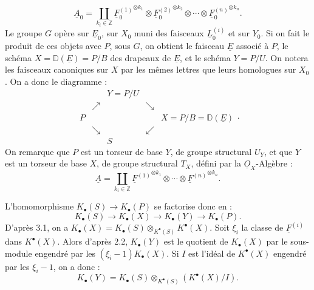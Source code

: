 
\[
\underline{A}_0=\coprod_{k_i\in\mathbb Z}{\underline{F}_0^{(1)}}^{\otimes k_1}\otimes {\underline{F}_0^{(2)}}^{\otimes k_2}\otimes\cdots\otimes{\underline{F}_0^{(n)}}^{\otimes k_n}.
\]
Le
groupe $G$ opère sur $\underline{E}_0$, sur $X_0$ muni des faisceaux $\underline{L}_0^{(i)}$ et sur $Y_0$. Si on fait le produit de ces objets avec $P$, sous $G$, on obtient le faisceau $\underline{E}$ associé à $P$, le schéma $X=\mathbb D(\underline{E})=P/B$ des drapeaux de $\underline{E}$, et le schéma $Y=P/U$. On notera les faisceaux canoniques sur $X$ par les mêmes lettres que leurs homologues sur $X_0$. On a donc le diagramme :
\[
\begin{array}{ccccc}
&& Y=P/U &&\\[-0.2em]
& \nearrow && \searrow &\\[-0.2em]
P &&&& X=P/B=\mathbb D(\underline{E})\\[-0.2em]
& \searrow && \swarrow &\\[-0.2em]
&& S &&
\end{array}.
\]
On remarque que $P$ est un torseur de base $Y$, de groupe structural $U_Y$, et que $Y$ est un torseur de base $X$, de groupe structural $T_X$, défini par la $\underline{O}_X$-Algèbre :
\[
\underline{A}=\coprod_{k_i\in\mathbb Z}{\underline{F}^{(1)}}^{\otimes k_1}\otimes\cdots\otimes{\underline{F}^{(n)}}^{\otimes k_n}.
\]

L'homomorphisme $K_\bullet(S)\to K_\bullet(P)$ se factorise donc en :
\[
K_\bullet(S)\longrightarrow K_\bullet(X)\longrightarrow K_\bullet(Y)\longrightarrow K_\bullet(P).
\]
D'après 3.1, on a $K_\bullet(X)=K_\bullet(S)\otimes_{K^{\bullet}(S)}K^{\bullet}(X)$. Soit $\xi_i$ la classe de $\underline{F}^{(i)}$ dans $K^{\bullet}(X)$. Alors d'après 2.2, $K_\bullet(Y)$ est le quotient de $K_\bullet(X)$ par le sous-module engendré par les $(\xi_i-1)K_\bullet(X)$. Si $I$ est l'idéal de $K^{\bullet}(X)$ engendré par les $\xi_i-1$, on a donc :
\[
K_\bullet(Y)=K_\bullet(S)\otimes_{K^{\bullet}(S)}(K^{\bullet}(X)/I).
\]
